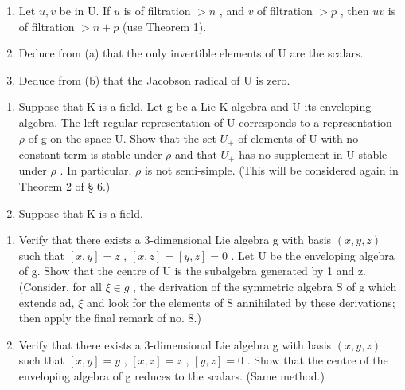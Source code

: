 \begin{enumerate}
\def\labelenumi{(\alph{enumi})}
\item
  Let \(u, v\) be in U. If \(u\) is of filtration \(> n\) , and \(v\) of filtration \(> p\) , then \(uv\) is of filtration \(> n + p\) (use Theorem 1).
\item
  Deduce from (a) that the only invertible elements of U are the scalars.
\item
  Deduce from (b) that the Jacobson radical of U is zero.
\end{enumerate}

\begin{enumerate}
\def\labelenumi{\arabic{enumi}.}
\setcounter{enumi}{2}
\item
  Suppose that K is a field. Let g be a Lie K-algebra and U its enveloping algebra. The left regular representation of U corresponds to a representation \(\rho\) of g on the space U. Show that the set \(U_{+}\) of elements of U with no constant term is stable under \(\rho\) and that \(U_{+}\) has no supplement in U stable under \(\rho\) . In particular, \(\rho\) is not semi-simple. (This will be considered again in Theorem 2 of § 6.)
\item
  Suppose that K is a field.
\end{enumerate}

\begin{enumerate}
\def\labelenumi{(\alph{enumi})}
\item
  Verify that there exists a 3-dimensional Lie algebra g with basis \((x, y, z)\) such that \([x, y] = z\) , \([x, z] = [y, z] = 0\) . Let U be the enveloping algebra of g. Show that the centre of U is the subalgebra generated by 1 and z. (Consider, for all \(\xi \in g\) , the derivation of the symmetric algebra S of g which extends ad, \(\xi\) and look for the elements of S annihilated by these derivations; then apply the final remark of no. 8.)
\item
  Verify that there exists a 3-dimensional Lie algebra g with basis \((x, y, z)\) such that \([x, y] = y\) , \([x, z] = z\) , \([y, z] = 0\) . Show that the centre of the enveloping algebra of g reduces to the scalars. (Same method.)
\end{enumerate}

